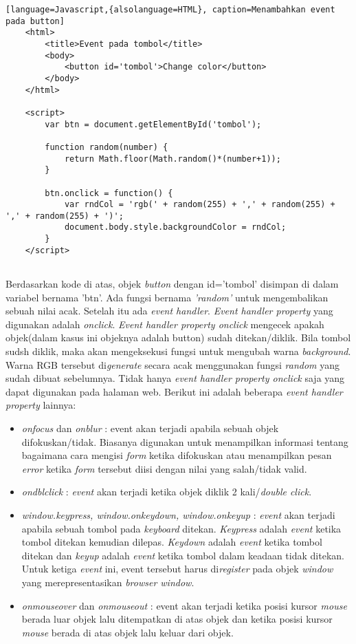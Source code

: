 \begin{lstlisting}[language=Javascript,{alsolanguage=HTML}, caption=Menambahkan event pada button]
	<html>
		<title>Event pada tombol</title>
		<body>
			<button id='tombol'>Change color</button>
		</body>
	</html>
	
	<script>
		var btn = document.getElementById('tombol');

		function random(number) {
  			return Math.floor(Math.random()*(number+1));
		}

		btn.onclick = function() {
  			var rndCol = 'rgb(' + random(255) + ',' + random(255) + ',' + random(255) + ')';
  			document.body.style.backgroundColor = rndCol;
		}
	</script>
	
\end{lstlisting}

Berdasarkan kode di atas, objek \textit{button} dengan id='tombol' disimpan di dalam variabel bernama 'btn'. Ada fungsi bernama \textit{'random'} untuk mengembalikan sebuah nilai acak. Setelah itu ada \textit{event handler}. \textit{Event handler property} yang digunakan adalah \textit{onclick}. \textit{Event handler property onclick} mengecek apakah objek(dalam kasus ini objeknya adalah button) sudah ditekan/diklik. Bila tombol sudsh diklik, maka akan mengeksekusi fungsi untuk mengubah warna \textit{background}. Warna RGB tersebut di\textit{generate} secara acak menggunakan fungsi \textit{random} yang sudah dibuat sebelumnya. Tidak hanya \textit{event handler property onclick} saja yang dapat digunakan pada halaman web. Berikut ini adalah beberapa \textit{event handler property} lainnya:

\begin{itemize}
	\item \textit{onfocus} dan \textit{onblur} : event akan terjadi apabila sebuah objek difokuskan/tidak. Biasanya digunakan untuk menampilkan informasi tentang bagaimana cara mengisi \textit{form} ketika difokuskan atau menampilkan pesan \textit{error} ketika \textit{form} tersebut diisi dengan nilai yang salah/tidak valid.
	\item \textit{ondblclick} : \textit{event} akan terjadi ketika objek diklik 2 kali/\textit{double click}.
	\item \textit{window.keypress, window.onkeydown, window.onkeyup} : \textit{event} akan terjadi apabila sebuah tombol pada \textit{keyboard} ditekan. \textit{Keypress} adalah \textit{event} ketika tombol ditekan kemudian dilepas. \textit{Keydown} adalah \textit{event} ketika tombol ditekan dan \textit{keyup} adalah \textit{event} ketika tombol dalam keadaan tidak ditekan. Untuk ketiga \textit{event} ini, event tersebut harus di\textit{register} pada objek \textit{window} yang merepresentasikan \textit{browser window}.
	\item \textit{onmouseover} dan \textit{onmouseout} : event akan terjadi ketika posisi kursor \textit{mouse} berada luar objek lalu ditempatkan di atas objek dan ketika posisi kursor \textit{mouse} berada di atas objek lalu keluar dari objek. 
\end{itemize}

